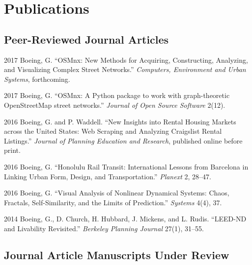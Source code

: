 \documentclass{academiccv}
\begin{document}
\section*{Publications}

\subsection*{Peer-Reviewed Journal Articles}

\begin{tablist}

\item[2017] \tab Boeing, G. \enquote{OSMnx: New Methods for Acquiring, Constructing, Analyzing, and Visualizing Complex Street Networks.} \emph{Computers, Environment and Urban Systems}, forthcoming.

\item[2017] \tab Boeing, G. \enquote{OSMnx: A Python package to work with graph-theoretic OpenStreetMap street networks.} \emph{Journal of Open Source Software} 2(12).

\item[2016] \tab Boeing, G. and P. Waddell. \enquote{New Insights into Rental Housing Markets across the United States: Web Scraping and Analyzing Craigslist Rental Listings.} \emph{Journal of Planning Education and Research}, published online before print.

\item[2016] \tab Boeing, G. \enquote{Honolulu Rail Transit: International Lessons from Barcelona in Linking Urban Form, Design, and Transportation.} \emph{Planext} 2, 28--47.

\item[2016] \tab Boeing, G. \enquote{Visual Analysis of Nonlinear Dynamical Systems: Chaos, Fractals, Self-Similarity, and the Limits of Prediction.} \emph{Systems} 4(4), 37.

\item[2014] \tab Boeing, G., D. Church, H. Hubbard, J. Mickens, and L. Rudis. \enquote{LEED-ND and Livability Revisited.} \emph{Berkeley Planning Journal} 27(1), 31--55.

\end{tablist}



\subsection*{Journal Article Manuscripts Under Review}
\end{document}
